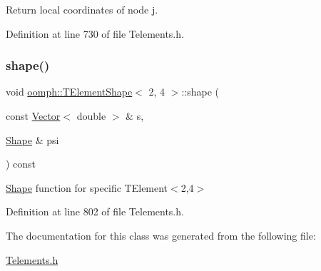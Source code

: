 Return local coordinates of node j. 



Definition at line 730 of file Telements.\+h.

\mbox{\label{classoomph_1_1TElementShape_3_012_00_014_01_4_ac0523fd4dd569033f5eccaaaa75cb3d1}} 
\subsubsection{\texorpdfstring{shape()}{shape()}}
{\footnotesize\ttfamily void \hyperlink{classoomph_1_1TElementShape}{oomph\+::\+T\+Element\+Shape}$<$ 2, 4 $>$\+::shape (\begin{DoxyParamCaption}\item[{const \hyperlink{classoomph_1_1Vector}{Vector}$<$ double $>$ \&}]{s,  }\item[{\hyperlink{classoomph_1_1Shape}{Shape} \&}]{psi }\end{DoxyParamCaption}) const\hspace{0.3cm}{\ttfamily [inline]}}



\hyperlink{classoomph_1_1Shape}{Shape} function for specific T\+Element$<$2,4$>$ 



Definition at line 802 of file Telements.\+h.



The documentation for this class was generated from the following file\+:\begin{DoxyCompactItemize}
\item 
\hyperlink{Telements_8h}{Telements.\+h}\end{DoxyCompactItemize}
